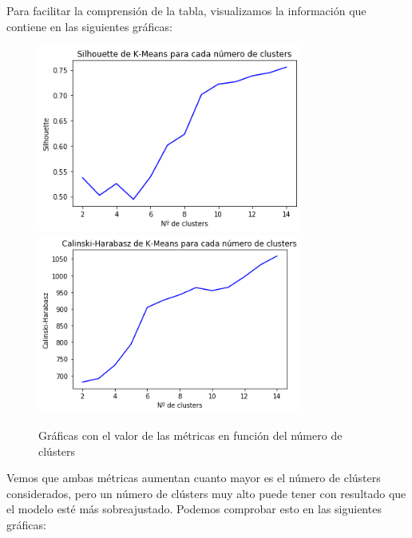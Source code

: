 \documentclass[a4]{article}
\begin{document}
Para facilitar la comprensión de la tabla, visualizamos la información que contiene en las siguientes gráficas:

\begin{figure}[H]
  \centering
  \caption{Gráficas con el valor de las métricas en función del número de clústers}
  \includegraphics[width=87mm]{imagenes/c2_kmeans_sil}
  \includegraphics[width=87mm]{imagenes/c2_kmeans_cal}
\end{figure}

Vemos que ambas métricas aumentan cuanto mayor es el número de clústers considerados, pero un número de clústers muy alto puede tener con resultado que el modelo esté más sobreajustado. Podemos comprobar esto en las siguientes gráficas:
\end{document}
